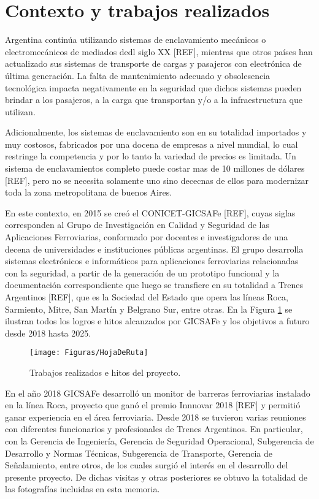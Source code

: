 \section{Contexto y trabajos realizados}

    Argentina continúa utilizando sistemas de enclavamiento mecánicos o electromecánicos de mediados dedl siglo XX [REF], mientras que otros países han actualizado sus sistemas de transporte de cargas y pasajeros con electrónica de última generación. La falta de mantenimiento adecuado y obsolesencia tecnológica impacta negativamente en la seguridad que dichos sistemas pueden brindar a los pasajeros, a la carga que transportan y/o a la infraestructura que utilizan.

    Adicionalmente, los sistemas de enclavamiento son en su totalidad importados y muy costosos, fabricados por una docena de empresas a nivel mundial, lo cual restringe la competencia y por lo tanto la variedad de precios es limitada. Un sistema de enclavamientos completo puede costar mas de 10 millones de dólares [REF], pero no se necesita solamente uno sino dececnas de ellos para modernizar toda la zona metropolitana de buenos Aires.

    En este contexto, en 2015 se creó el CONICET-GICSAFe [REF], cuyas siglas corresponden al Grupo de Investigación en Calidad y Seguridad de las Aplicaciones Ferroviarias, conformado por docentes e investigadores de una decena de universidades e instituciones públicas argentinas. El grupo desarrolla sistemas electrónicos e informáticos para aplicaciones ferroviarias relacionadas con la seguridad, a partir de la generación de un prototipo funcional y la documentación correspondiente que luego se transfiere en su totalidad a Trenes Argentinos [REF], que es la Sociedad del Estado que opera las líneas Roca, Sarmiento, Mitre, San Martín y Belgrano Sur, entre otras. En la Figura \ref{fig:contexto} se ilustran todos los logros e hitos alcanzados por GICSAFe y los objetivos a futuro desde 2018 hasta 2025.

    \begin{figure}[h]
        \centering
        \texttt{[image: Figuras/HojaDeRuta]}
        \centering\caption{Trabajos realizados e hitos del proyecto.}
        \label{fig:contexto}
    \end{figure}

    En el año 2018 GICSAFe desarrolló un monitor de barreras ferroviarias instalado en la línea Roca, proyecto que ganó el premio Innnovar 2018 [REF] y permitió ganar experiencia en el área ferroviaria. Desde 2018 se tuvieron varias reuniones con diferentes funcionarios y profesionales de Trenes Argentinos. En particular, con la Gerencia de Ingeniería, Gerencia de Seguridad Operacional, Subgerencia de Desarrollo y Normas Técnicas, Subgerencia de Transporte, Gerencia de Señalamiento, entre otros, de los cuales surgió el interés en el desarrollo del presente proyecto. De dichas visitas y otras posteriores se obtuvo la totalidad de las fotografías incluidas en esta memoria. 

